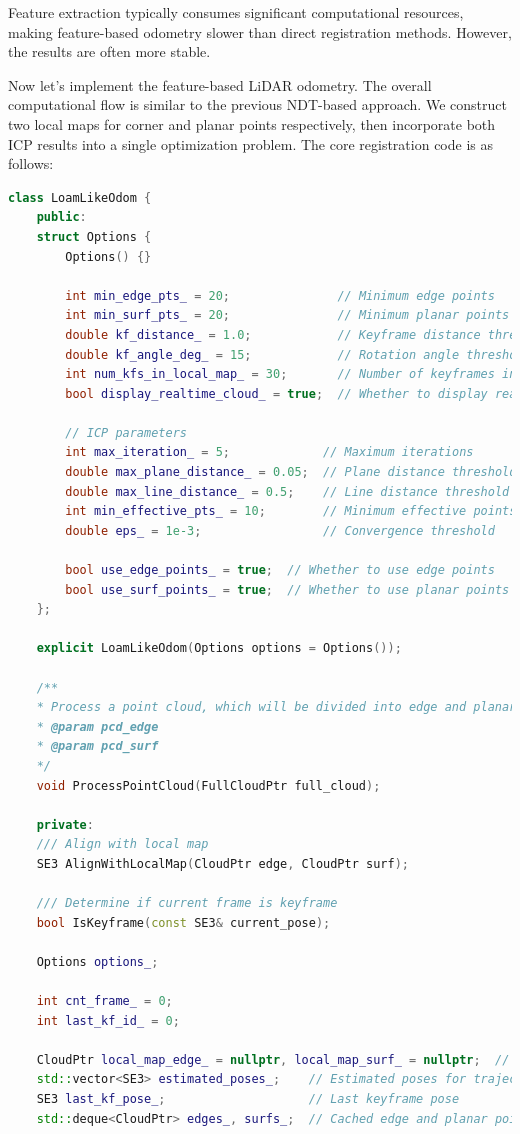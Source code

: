 Feature extraction typically consumes significant computational resources, making feature-based odometry slower than direct registration methods. However, the results are often more stable.

Now let's implement the feature-based LiDAR odometry. The overall computational flow is similar to the previous NDT-based approach. We construct two local maps for corner and planar points respectively, then incorporate both ICP results into a single optimization problem. The core registration code is as follows:

\begin{lstlisting}[language=c++,caption=src/ch7/loam-like/loam\_like\_odom.cc]
class LoamLikeOdom {
	public:
	struct Options {
		Options() {}
		
		int min_edge_pts_ = 20;               // Minimum edge points
		int min_surf_pts_ = 20;               // Minimum planar points
		double kf_distance_ = 1.0;            // Keyframe distance threshold
		double kf_angle_deg_ = 15;            // Rotation angle threshold
		int num_kfs_in_local_map_ = 30;       // Number of keyframes in local map
		bool display_realtime_cloud_ = true;  // Whether to display real-time cloud
		
		// ICP parameters
		int max_iteration_ = 5;             // Maximum iterations
		double max_plane_distance_ = 0.05;  // Plane distance threshold
		double max_line_distance_ = 0.5;    // Line distance threshold
		int min_effective_pts_ = 10;        // Minimum effective points
		double eps_ = 1e-3;                 // Convergence threshold
		
		bool use_edge_points_ = true;  // Whether to use edge points
		bool use_surf_points_ = true;  // Whether to use planar points
	};
	
	explicit LoamLikeOdom(Options options = Options());
	
	/**
	* Process a point cloud, which will be divided into edge and planar points
	* @param pcd_edge
	* @param pcd_surf
	*/
	void ProcessPointCloud(FullCloudPtr full_cloud);
	
	private:
	/// Align with local map
	SE3 AlignWithLocalMap(CloudPtr edge, CloudPtr surf);
	
	/// Determine if current frame is keyframe
	bool IsKeyframe(const SE3& current_pose);
	
	Options options_;
	
	int cnt_frame_ = 0;
	int last_kf_id_ = 0;
	
	CloudPtr local_map_edge_ = nullptr, local_map_surf_ = nullptr;  // Local maps
	std::vector<SE3> estimated_poses_;    // Estimated poses for trajectory
	SE3 last_kf_pose_;                    // Last keyframe pose
	std::deque<CloudPtr> edges_, surfs_;  // Cached edge and planar points
	

\end{lstlisting}
